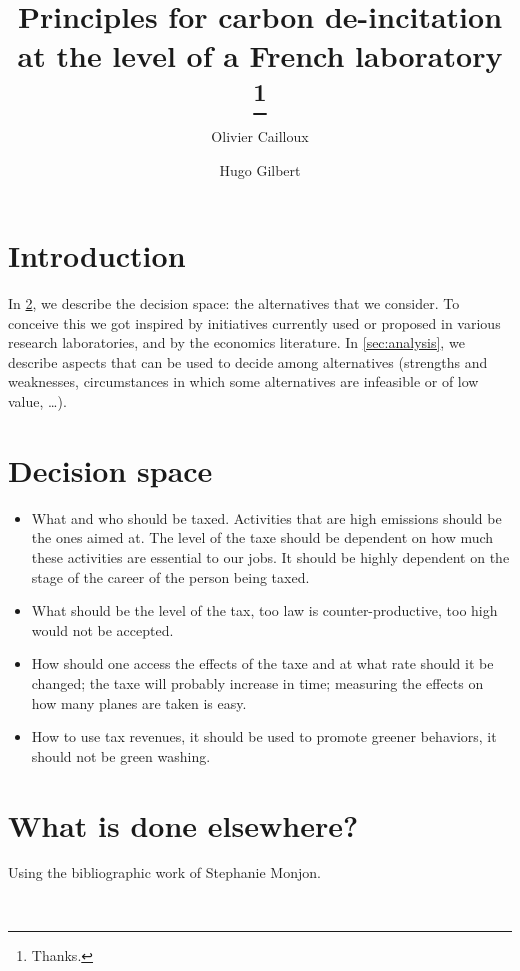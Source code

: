 \documentclass[version=3.21, pagesize, twoside=off, bibliography=totoc, DIV=calc, fontsize=12pt, a4paper]{scrartcl}
\title{Principles for carbon de-incitation at the level of a French laboratory \thanks{Thanks.}}
\author{Olivier Cailloux}
\author{Hugo Gilbert}
\affil{Université Paris-Dauphine, PSL Research University, CNRS, LAMSADE, 75016 PARIS, FRANCE\\
	\href{mailto:olivier.cailloux@dauphine.fr}{olivier.cailloux@dauphine.fr}
}
\begin{document}
\maketitle

\section{Introduction}
\label{sec:intro}
In \cref{sec:alts}, we describe the decision space: the alternatives that we consider. To conceive this we got inspired by initiatives currently used or proposed in various research laboratories, and by the economics literature. In \cref{sec:analysis}, we describe aspects that can be used to decide among alternatives (strengths and weaknesses, circumstances in which some alternatives are infeasible or of low value, …).

\section{Decision space}
\label{sec:alts}
\begin{itemize}
\item What and who should be taxed. Activities that are high emissions should be the ones aimed at. The level of the taxe should be dependent on how much these activities are essential to our jobs. It should be highly dependent on the stage of the career of the person being taxed.
\item What should be the level of the tax, too law is counter-productive, too high would not be accepted.  
\item How should one access the effects of the taxe and at what rate should it be changed; the taxe will probably increase in time; measuring the effects on how many planes are taken is easy.  
\item How to use tax revenues, it should be used to promote greener behaviors, it should not be green washing. 
\end{itemize}

\section{What is done elsewhere?} 
Using the bibliographic work of Stephanie Monjon. 

\
\end{document}
